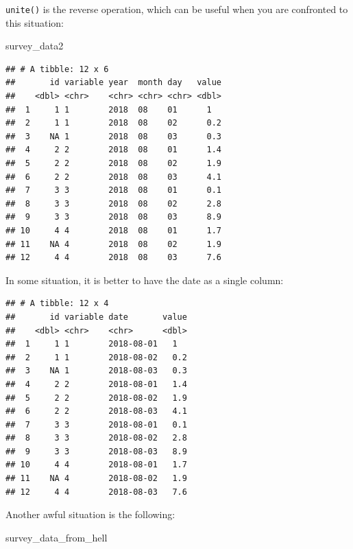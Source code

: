 \documentclass[]{gitbook}
\newenvironment{Shaded}{\begin{snugshade}}{\end{snugshade}}
\newcommand{\DataTypeTok}[1]{\textcolor[rgb]{0.13,0.29,0.53}{#1}}
\newcommand{\KeywordTok}[1]{\textcolor[rgb]{0.13,0.29,0.53}{\textbf{#1}}}
\newcommand{\NormalTok}[1]{#1}
\newcommand{\OperatorTok}[1]{\textcolor[rgb]{0.81,0.36,0.00}{\textbf{#1}}}
\newcommand{\StringTok}[1]{\textcolor[rgb]{0.31,0.60,0.02}{#1}}
\begin{document}
\texttt{unite()} is the reverse operation, which can be useful when you are confronted to this situation:

\begin{Shaded}
\begin{Highlighting}[]
\NormalTok{survey_data2}
\end{Highlighting}
\end{Shaded}

\begin{verbatim}
## # A tibble: 12 x 6
##       id variable year  month day   value
##    <dbl> <chr>    <chr> <chr> <chr> <dbl>
##  1     1 1        2018  08    01      1  
##  2     1 1        2018  08    02      0.2
##  3    NA 1        2018  08    03      0.3
##  4     2 2        2018  08    01      1.4
##  5     2 2        2018  08    02      1.9
##  6     2 2        2018  08    03      4.1
##  7     3 3        2018  08    01      0.1
##  8     3 3        2018  08    02      2.8
##  9     3 3        2018  08    03      8.9
## 10     4 4        2018  08    01      1.7
## 11    NA 4        2018  08    02      1.9
## 12     4 4        2018  08    03      7.6
\end{verbatim}

In some situation, it is better to have the date as a single column:

\begin{Shaded}
\end{Shaded}

\begin{verbatim}
## # A tibble: 12 x 4
##       id variable date       value
##    <dbl> <chr>    <chr>      <dbl>
##  1     1 1        2018-08-01   1  
##  2     1 1        2018-08-02   0.2
##  3    NA 1        2018-08-03   0.3
##  4     2 2        2018-08-01   1.4
##  5     2 2        2018-08-02   1.9
##  6     2 2        2018-08-03   4.1
##  7     3 3        2018-08-01   0.1
##  8     3 3        2018-08-02   2.8
##  9     3 3        2018-08-03   8.9
## 10     4 4        2018-08-01   1.7
## 11    NA 4        2018-08-02   1.9
## 12     4 4        2018-08-03   7.6
\end{verbatim}

Another awful situation is the following:

\begin{Shaded}
\begin{Highlighting}[]
\NormalTok{survey_data_from_hell}
\end{Highlighting}
\end{Shaded}
\end{document}
